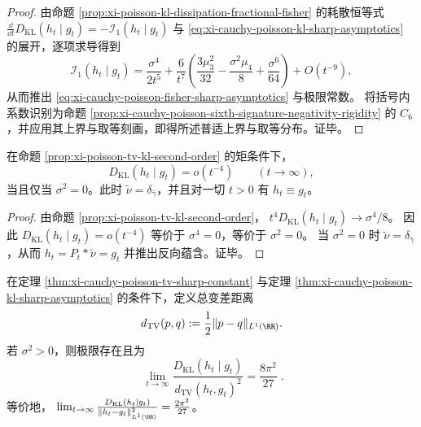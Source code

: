 \begin{proof}
由命题 \ref{prop:xi-poisson-kl-dissipation-fractional-fisher} 的耗散恒等式
\(
\frac{\dd}{\dd t}D_{\mathrm{KL}}(h_t\mid g_t)=-\mathcal I_1(h_t\mid g_t)
\)
与 \eqref{eq:xi-cauchy-poisson-kl-sharp-asymptotics} 的展开，逐项求导得到
\[
\mathcal I_1(h_t\mid g_t)
=\frac{\sigma^4}{2t^5}
+\frac{6}{t^7}\left(
\frac{3\mu_3^2}{32}
-\frac{\sigma^2\mu_4}{8}
+\frac{\sigma^6}{64}
\right)
+O(t^{-9}),
\]
从而推出 \eqref{eq:xi-cauchy-poisson-fisher-sharp-asymptotics} 与极限常数。
将括号内系数识别为命题 \ref{prop:xi-cauchy-poisson-sixth-signature-negativity-rigidity} 的 \(C_6\)，并应用其上界与取等刻画，即得所述普适上界与取等分布。证毕。
\end{proof}

\begin{corollary}\label{cor:xi-cauchy-poisson-kl-rigidity}
在命题 \ref{prop:xi-poisson-tv-kl-second-order} 的矩条件下，
\[
D_{\mathrm{KL}}(h_t\mid g_t)=o(t^{-4})\qquad(t\to\infty),
\]
当且仅当 \(\sigma^2=0\)。此时 \(\tilde\nu=\delta_{\bar\gamma}\)，并且对一切 \(t>0\) 有 \(h_t\equiv g_t\)。
\end{corollary}

\begin{proof}
由命题 \ref{prop:xi-poisson-tv-kl-second-order}，
\(
t^4D_{\mathrm{KL}}(h_t\mid g_t)\to \sigma^4/8
\)。
因此 \(D_{\mathrm{KL}}(h_t\mid g_t)=o(t^{-4})\) 等价于 \(\sigma^4=0\)，等价于 \(\sigma^2=0\)。
当 \(\sigma^2=0\) 时 \(\tilde\nu=\delta_{\bar\gamma}\)，从而 \(h_t=P_t*\tilde\nu=g_t\) 并推出反向蕴含。证毕。
\end{proof}

\begin{corollary}\label{cor:xi-cauchy-poisson-pinsker-sharp-ratio}
在定理 \ref{thm:xi-cauchy-poisson-tv-sharp-constant} 与定理 \ref{thm:xi-cauchy-poisson-kl-sharp-asymptotics} 的条件下，定义总变差距离
\[
d_{\mathrm{TV}}(p,q):=\frac12\|p-q\|_{L^1(\RR)}.
\]
若 \(\sigma^2>0\)，则极限存在且为
\begin{equation}\label{eq:xi-cauchy-poisson-pinsker-sharp-ratio}
\boxed{\;
\lim_{t\to\infty}\frac{D_{\mathrm{KL}}(h_t\mid g_t)}{d_{\mathrm{TV}}(h_t,g_t)^2}
=\frac{8\pi^2}{27}\; }.
\end{equation}
\noindent
等价地，
\(
\lim_{t\to\infty}\frac{D_{\mathrm{KL}}(h_t\mid g_t)}{\|h_t-g_t\|_{L^1(\RR)}^2}
=\frac{2\pi^2}{27}
\)。
\end{corollary}


